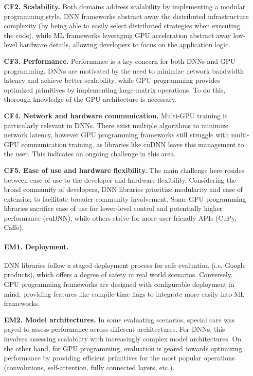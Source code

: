 \textbf{CF2. Scalability.}
Both domains address scalability by implementing a modular programming style. DNN frameworks
abstract away the distributed infrastructure complexity (by being able to easily select distributed
strategies when executing the code), while ML frameworks leveraging GPU acceleration abstract away
low-level hardware details, allowing developers to focus on the application logic.





\textbf{CF3. Performance.}
Performance is a key concern for both DNNs and GPU programming. DNNs are motivated by the need to
minimize network bandwidth latency and achieve better scalability, while GPU programming provides
optimized primitives by implementing large-matrix operations. To do this, thorough
knowledge of the GPU architecture is necessary.

\textbf{CF4. Network and hardware communication.}
Multi-GPU training is particularly relevant in DNNs. There exist multiple algorithms to minimize
network latency, however GPU programming frameworks still struggle with multi-GPU communication
training, as libraries like cuDNN leave this management to the user. This indicates an ongoing
challenge in this area.

\textbf{CF5. Ease of use and hardware flexibility.}
The main challenge here resides between ease of use to the developer and hardware flexibility.
Considering the broad community of developers, DNN libraries prioritize modularity and ease of
extension to facilitate broader community involvement. Some GPU programming libraries sacrifice ease of use for lower-level control
and potentially higher performance (cuDNN), while others strive for more user-friendly APIs (CuPy, Caffe).

\paragraph{EM1. Deployment.}
DNN libraries follow a staged deployment process for safe evaluation (i.e. Google products), which
offers a degree of safety in real world scenarios. Conversely, GPU programming frameworks are
designed with configurable deployment in mind, providing features like compile-time flags to
integrate more easily into ML frameworks.

\textbf{EM2. Model architectures.}
In some evaluating scenarios, special care was payed to assess performance across different architectures.
For DNNs, this involves assessing scalability with increasingly complex model architectures. On the other hand,
for GPU programming, evaluation is geared towards optimizing performance by providing efficient primitives
for the most popular operations (convolutions, self-attention, fully connected layers, etc.).


